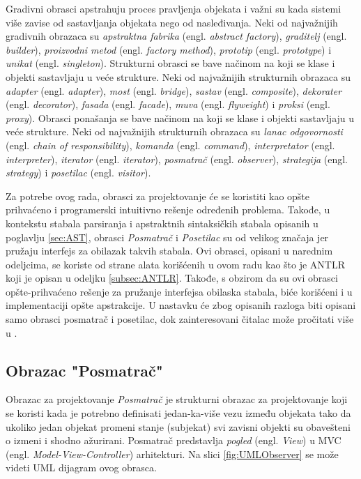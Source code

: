 Gradivni obrasci apstrahuju proces pravljenja objekata i važni su kada sistemi više zavise od sastavljanja objekata nego od nasleđivanja. Neki od najvažnijih gradivnih obrazaca su \emph{apstraktna fabrika} (engl. \emph{abstract factory}), \emph{graditelj} (engl. \emph{builder}), \emph{proizvodni metod} (engl. \emph{factory method}), \emph{prototip} (engl. \emph{prototype}) i \emph{unikat} (engl. \emph{singleton}). Strukturni obrasci se bave načinom na koji se klase i objekti sastavljaju u veće strukture. Neki od najvažnijih strukturnih obrazaca su \emph{adapter} (engl. \emph{adapter}), \emph{most} (engl. \emph{bridge}), \emph{sastav} (engl. \emph{composite}), \emph{dekorater} (engl. \emph{decorator}), \emph{fasada} (engl. \emph{facade}), \emph{muva} (engl. \emph{flyweight}) i \emph{proksi} (engl. \emph{proxy}). Obrasci ponašanja se bave načinom na koji se klase i objekti sastavljaju u veće strukture. Neki od najvažnijih strukturnih obrazaca su \emph{lanac odgovornosti} (engl. \emph{chain of responsibility}), \emph{komanda} (engl. \emph{command}), \emph{interpretator} (engl. \emph{interpreter}), \emph{iterator} (engl. \emph{iterator}), \emph{posmatrač} (engl. \emph{observer}), \emph{strategija} (engl. \emph{strategy}) i \emph{posetilac} (engl. \emph{visitor}).

Za potrebe ovog rada, obrasci za projektovanje će se koristiti kao opšte prihvaćeno i programerski intuitivno rešenje određenih problema. Takođe, u kontekstu stabala parsiranja i apstraktnih sintaksičkih stabala opisanih u poglavlju \ref{sec:AST}, obrasci \emph{Posmatrač} i \emph{Posetilac} su od velikog značaja jer pružaju interfejs za obilazak takvih stabala. Ovi obrasci, opisani u narednim odeljcima, se koriste od strane alata korišćenih u ovom radu kao što je ANTLR koji je opisan u odeljku \ref{subsec:ANTLR}. Takođe, s obzirom da su ovi obrasci opšte-prihvaćeno rešenje za pružanje interfejsa obilaska stabala, biće korišćeni i u implementaciji opšte apstrakcije. U nastavku će zbog opisanih razloga biti opisani samo obrasci posmatrač i posetilac, dok zainteresovani čitalac može pročitati više u \cite{DesignPatternsBook}.

\subsection{Obrazac "Posmatrač"}
\label{subsec:DesignPatternsObserver}

Obrazac za projektovanje \emph{Posmatrač} je strukturni obrazac za projektovanje koji se koristi kada je potrebno definisati jedan-ka-više vezu između objekata tako da ukoliko jedan objekat promeni stanje (subjekat) svi zavisni objekti su obavešteni o izmeni i shodno ažurirani. Posmatrač predstavlja \emph{pogled} (engl. \emph{View}) u MVC (engl. \emph{Model-View-Controller}) arhitekturi. Na slici \ref{fig:UMLObserver} se može videti UML dijagram \cite{UML} ovog obrasca. 

